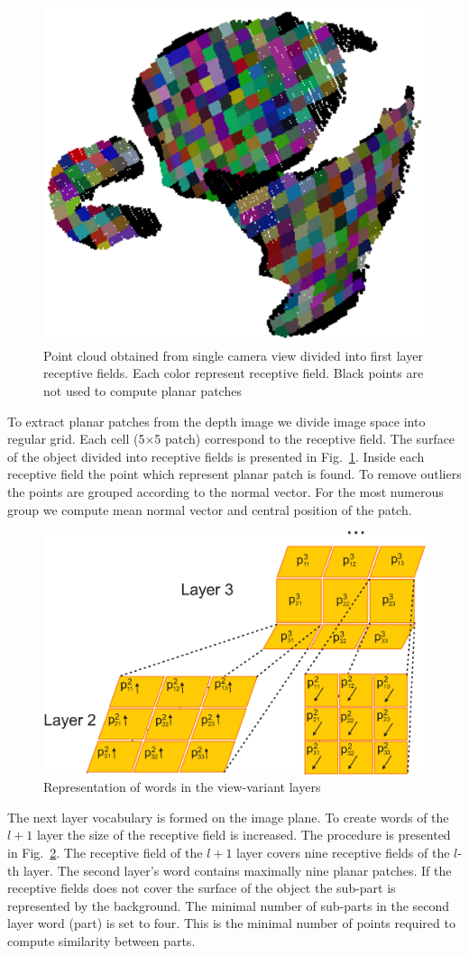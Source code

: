 \documentclass[letterpaper,10pt,conference]{ieeeconf}  %
\begin{document}
\begin{figure}[t]
 \centering
\includegraphics[width=0.5\columnwidth]{../images/recFields1.eps}
\caption{Point cloud obtained from single camera view divided into first layer receptive fields. Each color represent receptive field. Black points are not used to compute planar patches}
 \label{recFields1}
\end{figure}

To extract planar patches from the depth image we divide image space into regular grid. Each cell (5$\times$5 patch) correspond to the receptive field. The surface of the object divided into receptive fields is presented in Fig.~\ref{recFields1}. Inside each receptive field the point which represent planar patch is found. To remove outliers the points are grouped according to the normal vector. For the most numerous group we compute mean normal vector and central position of the patch.

\begin{figure}[t]
 \centering
\includegraphics[width=0.9\columnwidth]{../images/word.eps}
\caption{Representation of words in the view-variant layers}
 \label{word}
\end{figure}

The next layer vocabulary is formed on the image plane. To create words of the $l+1$ layer the size of the receptive field is increased. The procedure is presented in Fig.~\ref{word}. The receptive field of the $l+1$ layer covers nine receptive fields of the $l$-th layer. The second layer's word contains maximally nine planar patches. If the receptive fields does not cover the surface of the object the sub-part is represented by the background. The minimal number of sub-parts in the second layer word (part) is set to four. This is the minimal number of points required to compute similarity between parts.
\end{document}
